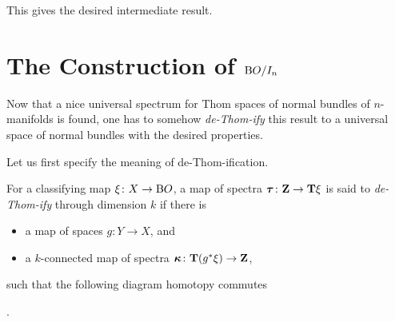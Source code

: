 This gives the desired intermediate result.


\section*{The Construction of $\mathrm{B}O/I_{n}$}
Now that a nice universal spectrum for Thom spaces of normal bundles
of $n$-manifolds is found, one has to somehow \emph{de-Thom-ify} this
result to a universal space of normal bundles with the desired
properties.

Let us first specify the meaning of de-Thom-ification.
\begin{Def*}
  For a classifying map $\xi\colon X\to\mathrm{B}O$, a map of spectra
  $\bm{\tau}\colon\bm{\mathrm{Z}}\to\bm{\mathrm{T}}{\xi}$ is said to
  \emph{de-Thom-ify} through dimension $k$ if there is
  \begin{itemize}
  \item a map of spaces $g\colon Y\to X$, and
  \item a $k$-connected map of spectra
    $\bm{\kappa}\colon\bm{\mathrm{T}}{({g}^*\xi)}\to\bm{\mathrm{Z}}$,
  \end{itemize}
  such that the following diagram homotopy commutes
  \begin{center}
    .
  \end{center}
\end{Def*}


